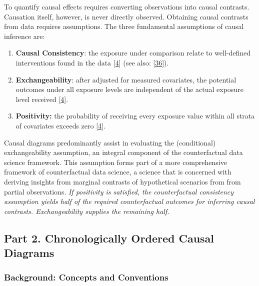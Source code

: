 \documentclass[
  singlecolumn]{article}
\begin{document}
To quantify causal effects requires converting observations into causal
contrasts. Causation itself, however, is never directly observed.
Obtaining causal contrasts from data requires assumptions. The three
fundamental assumptions of causal inference are:

\begin{enumerate}
\def\labelenumi{\arabic{enumi}.}
\item
  \textbf{Causal Consistency}: the exposure under comparison relate to
  well-defined interventions found in the data
  {[}\protect\hyperlink{ref-hernuxe1n2023}{4}{]} (see also:
  {[}\protect\hyperlink{ref-chatton2020}{36}{]}).
\item
  \textbf{Exchangeability}: after adjusted for measured covariates, the
  potential outcomes under all exposure levels are independent of the
  actual exposure level received
  {[}\protect\hyperlink{ref-hernuxe1n2023}{4}{]}.
\item
  \textbf{Positivity:} the probability of receiving every exposure value
  within all strata of covariates exceeds zero
  {[}\protect\hyperlink{ref-hernuxe1n2023}{4}{]}.
\end{enumerate}

Causal diagrams predominantly assist in evaluating the (conditional)
exchangeability assumption, an integral component of the counterfactual
data science framework. This assumption forms part of a more
comprehensive framework of counterfactual data science, a science that
is concerned with deriving insights from marginal contrasts of
hypothetical scenarios from from partial observations. \emph{If
positivity is satisfied, the counterfactual consistency assumption
yields half of the required counterfactual outcomes for inferring causal
contrasts. Exchangeability supplies the remaining half.}

\hypertarget{part-2.-chronologically-ordered-causal-diagrams}{%
\subsection{Part 2. Chronologically Ordered Causal
Diagrams}\label{part-2.-chronologically-ordered-causal-diagrams}}

\hypertarget{background-concepts-and-conventions}{%
\subsubsection{Background: Concepts and
Conventions}\label{background-concepts-and-conventions}}
\end{document}
